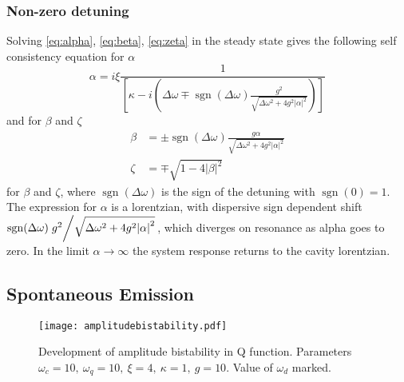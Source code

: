 \subsubsection{Non-zero detuning}
Solving \cref{eq:alpha}, \cref{eq:beta}, \cref{eq:zeta} in the steady state gives the following self consistency equation for $\alpha$
\begin{equation}
  \alpha = i \xi\frac{1}{\left[\kappa-i\left(\Delta \omega \mp \operatorname{sgn}(\Delta \omega) \frac{g^2}{\sqrt{\Delta \omega^2 +4g^2 |\alpha|^2}}\right)\right]}
\end{equation}
and for $\beta$ and $\zeta$
\begin{align}
  \beta& = \pm \operatorname{sgn}(\Delta \omega) \frac{g \alpha}{\sqrt{\Delta \omega^2 + 4 g^2 |\alpha|^2}}\\
  \zeta& = \mp \sqrt{1-4|\beta|^2}
\end{align}
for $\beta$ and $\zeta$, where $\operatorname{sgn}(\Delta \omega)$ is the sign of the detuning with $\operatorname{sgn}(0) = 1$.
The expression for $\alpha$ is a lorentzian, with dispersive sign dependent shift $ \operatorname{sgn}(\Delta\omega)\flatfrac{g^2}{\sqrt{\Delta\omega^2+4g^2\abs{\alpha}^2}}$, which diverges on resonance as alpha goes to zero. 
In the limit $\alpha \rightarrow \infty$ the system response returns to the cavity lorentzian.

\subsection{Spontaneous Emission}
\begin{figure*}[t]
  \texttt{[image: amplitudebistability.pdf]}
  \caption{Development of amplitude bistability in Q function. Parameters $\omega_c=10,\ \omega_q=10,\ \xi=4,\ \kappa=1,\ g=10$. Value of $\omega_d$ marked.}
  \label{amplitudebistability}
\end{figure*}

